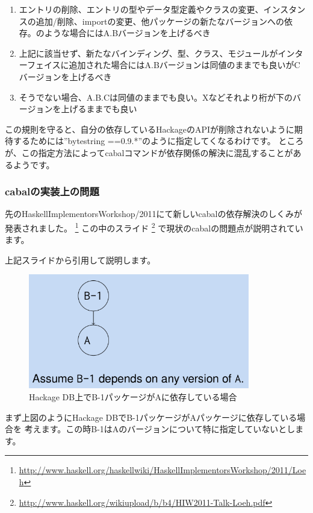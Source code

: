 \documentclass[mingoth,a4paper]{jsarticle}
\begin{document}
\begin{enumerate}
 \item エントリの削除、エントリの型やデータ型定義やクラスの変更、インスタンスの追加/削除、importの変更、他パッケージの新たなバージョンへの依存。のような場合にはA.Bバージョンを上げるべき
 \item 上記に該当せず、新たなバインディング、型、クラス、モジュールがインターフェイスに追加された場合にはA.Bバージョンは同値のままでも良いがCバージョンを上げるべき
 \item そうでない場合、A.B.Cは同値のままでも良い。Xなどそれより桁が下のバージョンを上げるままでも良い
\end{enumerate}

この規則を守ると、自分の依存しているHackageのAPIが削除されないように期待するためには''bytestring ==0.9.*''のように指定してくなるわけです。
ところが、この指定方法によってcabalコマンドが依存関係の解決に混乱することがあるようです。

\subsubsection{cabalの実装上の問題}
先のHaskellImplementorsWorkshop/2011にて新しいcabalの依存解決のしくみが発表されました。
\footnote{\url{http://www.haskell.org/haskellwiki/HaskellImplementorsWorkshop/2011/Loeh}}
この中のスライド
\footnote{\url{http://www.haskell.org/wikiupload/b/b4/HIW2011-Talk-Loeh.pdf}}
で現状のcabalの問題点が説明されています。

上記スライドから引用して説明します。

\begin{figure}[ht]
  \begin{center}
    \includegraphics[height=5cm]{image201110/cabal-1.png}
  \end{center}
  \label{fig:cabal-1}\caption{Hackage DB上でB-1パッケージがAに依存している場合}
\end{figure}

まず上図のようにHackage DBでB-1パッケージがAパッケージに依存している場合を
考えます。この時B-1はAのバージョンについて特に指定していないとします。
\end{document}
